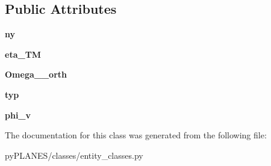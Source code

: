 \subsection*{Public Attributes}
\begin{DoxyCompactItemize}
\item 
\mbox{\label{classpy_p_l_a_n_e_s_1_1classes_1_1entity__classes_1_1_incident_pw_fem_a704684f4dfb8246b9b066f1fc90f4a79}} 
{\bfseries ny}
\item 
\mbox{\label{classpy_p_l_a_n_e_s_1_1classes_1_1entity__classes_1_1_incident_pw_fem_ac8129c9c10bcd7565ff7839fa7dd1d5c}} 
{\bfseries eta\+\_\+\+TM}
\item 
\mbox{\label{classpy_p_l_a_n_e_s_1_1classes_1_1entity__classes_1_1_incident_pw_fem_ac266ab7fdeb3adee259294a517a56918}} 
{\bfseries Omega\+\_\+\_\+orth}
\item 
\mbox{\label{classpy_p_l_a_n_e_s_1_1classes_1_1entity__classes_1_1_incident_pw_fem_a6e15e7e33cf878de840d225fda43ae84}} 
{\bfseries typ}
\item 
\mbox{\label{classpy_p_l_a_n_e_s_1_1classes_1_1entity__classes_1_1_incident_pw_fem_ae0ed1679ddccb68d95a78b72b14b98c4}} 
{\bfseries phi\+\_\+v}
\end{DoxyCompactItemize}


The documentation for this class was generated from the following file\+:\begin{DoxyCompactItemize}
\item 
py\+P\+L\+A\+N\+E\+S/classes/entity\+\_\+classes.\+py\end{DoxyCompactItemize}
